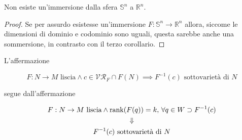 \begin{corollary}[4]\label{imm_sph}
	Non esiste un'immersione dalla sfera $ \mathbb{S}^{n} $ a $ \mathbb{R}^{n} $.
\end{corollary}

\begin{proof}
	Se per assurdo esistesse un'immersione $ F : \mathbb{S}^{n} \to \mathbb{R}^{n} $ allora, siccome le dimensioni di dominio e codominio sono uguali, questa sarebbe anche una sommersione, in contrasto con il terzo corollario.
\end{proof}

\begin{remark}
	L'affermazione
	
	\begin{equation}
		F : N \to M \text{ liscia} \wedge c \in \mathcal{VR}_{F} \cap F(N) \implies F^{-1}(c) \text{ sottovarietà di } N
	\end{equation}

	segue dall'affermazione
	
	\begin{gather}
		F : N \to M \text{ liscia} \wedge \rank(F(q)) = k, \, \forall q \in W \supset F^{-1}(c)\nonumber\\
		\Downarrow\\
		F^{-1}(c) \text{ sottovarietà di } N\nonumber
	\end{gather}
\end{remark}

